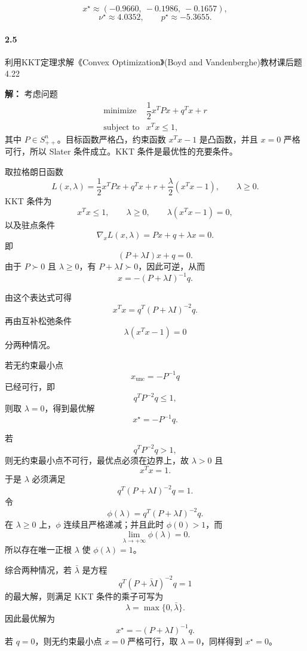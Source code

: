 \documentclass[12pt,a4paper]{article}
\begin{document}
\[
  \boxed{x^\star\approx(-0.9660,\ -0.1986,\ -0.1657),}
\]
\[
  \boxed{\nu^\star\approx4.0352,\qquad p^\star\approx-5.3655.}
\]


\paragraph{2.5} 利用KKT定理求解《Convex Optimization》(Boyd and Vandenberghe)教材课后题4.22

\textbf{解：}
考虑问题
\[
\begin{array}{ll}
  \text{minimize} & \dfrac12x^TPx+q^Tx+r\\[0.3em]
  \text{subject to} & x^Tx\leq1,
\end{array}
\]
其中 $P\in S_{++}^n$。目标函数严格凸，约束函数 $x^Tx-1$ 是凸函数，并且 $x=0$ 严格可行，所以 Slater 条件成立。KKT 条件是最优性的充要条件。

取拉格朗日函数
\[
  L(x,\lambda)
  =\frac12x^TPx+q^Tx+r+\frac{\lambda}{2}(x^Tx-1),
  \qquad \lambda\geq0.
\]
KKT 条件为
\[
  x^Tx\leq1,\qquad \lambda\geq0,\qquad
  \lambda(x^Tx-1)=0,
\]
以及驻点条件
\[
  \nabla_xL(x,\lambda)=Px+q+\lambda x=0.
\]
即
\[
  (P+\lambda I)x+q=0.
\]
由于 $P\succ0$ 且 $\lambda\geq0$，有 $P+\lambda I\succ0$，因此可逆，从而
\[
  \boxed{x=-(P+\lambda I)^{-1}q.}
\]

由这个表达式可得
\[
  x^Tx=q^T(P+\lambda I)^{-2}q.
\]
再由互补松弛条件
\[
  \lambda(x^Tx-1)=0
\]
分两种情况。

若无约束最小点
\[
  x_{\mathrm{unc}}=-P^{-1}q
\]
已经可行，即
\[
  q^TP^{-2}q\leq1,
\]
则取 $\lambda=0$，得到最优解
\[
  x^\star=-P^{-1}q.
\]

若
\[
  q^TP^{-2}q>1,
\]
则无约束最小点不可行，最优点必须在边界上，故 $\lambda>0$ 且
\[
  x^Tx=1.
\]
于是 $\lambda$ 必须满足
\[
  \boxed{q^T(P+\lambda I)^{-2}q=1.}
\]
令
\[
  \phi(\lambda)=q^T(P+\lambda I)^{-2}q.
\]
在 $\lambda\geq0$ 上，$\phi$ 连续且严格递减；并且此时 $\phi(0)>1$，而
\[
  \lim_{\lambda\to+\infty}\phi(\lambda)=0.
\]
所以存在唯一正根 $\lambda$ 使 $\phi(\lambda)=1$。

综合两种情况，若 $\bar\lambda$ 是方程
\[
  q^T(P+\bar\lambda I)^{-2}q=1
\]
的最大解，则满足 KKT 条件的乘子可写为
\[
  \boxed{\lambda=\max\{0,\bar\lambda\}.}
\]
因此最优解为
\[
  \boxed{x^\star=-(P+\lambda I)^{-1}q.}
\]
若 $q=0$，则无约束最小点 $x=0$ 严格可行，取 $\lambda=0$，同样得到 $x^\star=0$。
\end{document}
